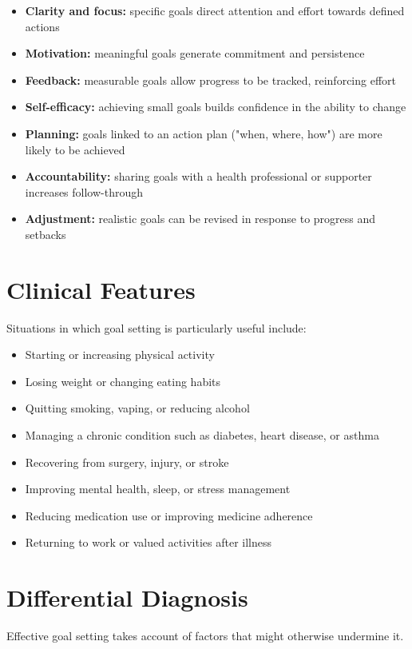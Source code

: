 \begin{itemize}
    \item \textbf{Clarity and focus:} specific goals direct attention and effort towards defined actions
    \item \textbf{Motivation:} meaningful goals generate commitment and persistence
    \item \textbf{Feedback:} measurable goals allow progress to be tracked, reinforcing effort
    \item \textbf{Self-efficacy:} achieving small goals builds confidence in the ability to change
    \item \textbf{Planning:} goals linked to an action plan ("when, where, how") are more likely to be achieved
    \item \textbf{Accountability:} sharing goals with a health professional or supporter increases follow-through
    \item \textbf{Adjustment:} realistic goals can be revised in response to progress and setbacks
\end{itemize}

\section*{Clinical Features}
Situations in which goal setting is particularly useful include:

\begin{itemize}
    \item Starting or increasing physical activity
    \item Losing weight or changing eating habits
    \item Quitting smoking, vaping, or reducing alcohol
    \item Managing a chronic condition such as diabetes, heart disease, or asthma
    \item Recovering from surgery, injury, or stroke
    \item Improving mental health, sleep, or stress management
    \item Reducing medication use or improving medicine adherence
    \item Returning to work or valued activities after illness
\end{itemize}

\section*{Differential Diagnosis}
Effective goal setting takes account of factors that might otherwise undermine it.

